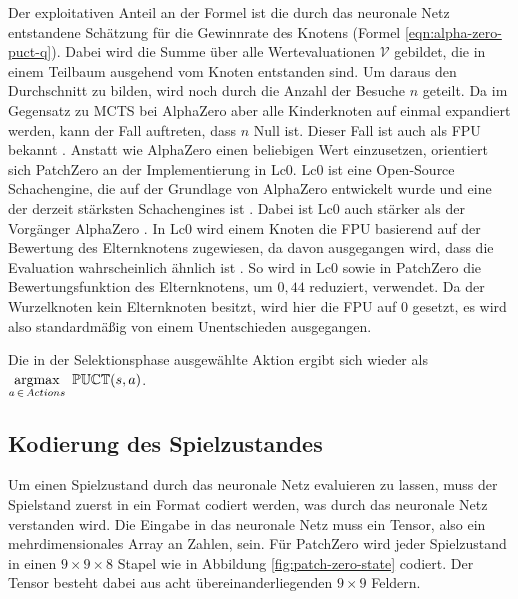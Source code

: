 Der exploitativen Anteil an der Formel ist die durch das neuronale Netz entstandene Schätzung für die Gewinnrate des Knotens (Formel \ref{eqn:alpha-zero-puct-q}). Dabei wird die Summe über alle Wertevaluationen $\mathcal{V}$ gebildet, die in einem Teilbaum ausgehend vom Knoten entstanden sind. Um daraus den Durchschnitt zu bilden, wird noch durch die Anzahl der Besuche $n$ geteilt. Da im Gegensatz zu \ac{MCTS} bei AlphaZero aber alle Kinderknoten auf einmal expandiert werden, kann der Fall auftreten, dass $n$ Null ist. Dieser Fall ist auch als \ac{FPU} bekannt \cite[S. 4]{2006.FPU}. Anstatt wie AlphaZero einen beliebigen Wert einzusetzen, orientiert sich PatchZero an der Implementierung in \ac{Lc0}. \acl{Lc0} ist eine Open-Source Schachengine, die auf der Grundlage von AlphaZero entwickelt wurde und eine der derzeit stärksten Schachengines ist \cite{2024.Lc0}. Dabei ist \ac{Lc0} auch stärker als der Vorgänger AlphaZero \cite{2024.Lc0vsAlphaZero}. In \ac{Lc0} wird einem Knoten die \ac{FPU} basierend auf der Bewertung des Elternknotens zugewiesen, da davon ausgegangen wird, dass die Evaluation wahrscheinlich ähnlich ist \cite{2018.Lc0AlphaZero}. So wird in \ac{Lc0} sowie in PatchZero die Bewertungsfunktion des Elternknotens, um $0{,}44$ reduziert, verwendet. Da der Wurzelknoten kein Elternknoten besitzt, wird hier die \ac{FPU} auf 0 gesetzt, es wird also standardmäßig von einem Unentschieden ausgegangen.

Die in der Selektionsphase ausgewählte Aktion ergibt sich wieder als $\argmax\limits_{a\, \in\, Actions}\ \mathbb{PUCT}(s,a)$.

\pagebreak

\subsection{Kodierung des Spielzustandes}

Um einen Spielzustand durch das neuronale Netz evaluieren zu lassen, muss der Spielstand zuerst in ein Format codiert werden, was durch das neuronale Netz verstanden wird. Die Eingabe in das neuronale Netz muss ein Tensor, also ein mehrdimensionales Array an Zahlen, sein. Für PatchZero wird jeder Spielzustand in einen $9\times 9\times 8$ Stapel wie in Abbildung \ref{fig:patch-zero-state} codiert. Der Tensor besteht dabei aus acht übereinanderliegenden $9\times 9$ Feldern.

